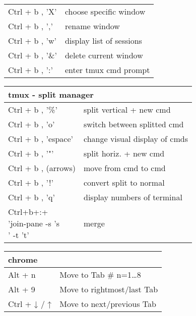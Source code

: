 \documentclass{article}
\begin{document}
\begin{landscape}
\begin{multicols*}{3}
\begin{tabular}{m{3cm}m{5cm}}
            \rowcolor{LightCyan}
            Ctrl + b , 'X'  & choose specific window                \\
            Ctrl + b , ','  & rename window                         \\
            \rowcolor{LightCyan}
            Ctrl + b , 'w'  & display list of sessions              \\
            Ctrl + b , '\&' & delete current window                 \\
            \rowcolor{LightCyan}
            Ctrl + b , ':'  & enter tmux cmd prompt
        \end{tabular}
        \vspace{5pt}
        \begin{tabular}{m{3cm}m{5cm}}
            \multicolumn{2}{l}{\textbf{tmux - split manager}  } \\
            \hline
            Ctrl + b , '\%'     & split vertical + new cmd      \\
            \rowcolor{LightCyan}
            Ctrl + b , 'o'      & switch between splitted cmd   \\
            Ctrl + b , 'espace' & change visual display of cmds \\
            \rowcolor{LightCyan}
            Ctrl + b , '"'      & split horiz. + new cmd        \\
            Ctrl + b , (arrows) & move from cmd to cmd          \\
            \rowcolor{LightCyan}
            Ctrl + b , '!'      & convert split to normal       \\
            Ctrl + b , 'q'      & display numbers of terminal   \\
            \rowcolor{LightCyan}
            \makecell{Ctrl+b+:+                                 \\'join-pane -s 's\\' -t 't'} & merge
        \end{tabular}
        \vspace{5pt}
        \begin{tabular}{m{3cm}m{5cm}}
            \multicolumn{2}{l}{\textbf{chrome}  }                   \\
            \hline
            Alt + n             & Move to Tab \# n={1…8}            \\
            \rowcolor{LightCyan}
            Alt + 9             & Move to rightmost/last Tab        \\
            Ctrl + ↓ / ↑        & Move to next/previous Tab         \\

\end{tabular}
\end{multicols*}
\end{landscape}
\end{document}

